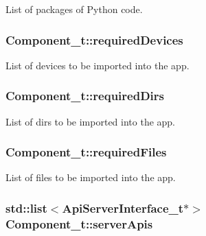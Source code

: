List of packages of Python code. 

\subsubsection[{\texorpdfstring{required\+Devices}{requiredDevices}}]{ Component\+\_\+t\+::required\+Devices}\hypertarget{struct_component__t_ad7349b66409d8767fc2ea653f87034cb}{}\label{struct_component__t_ad7349b66409d8767fc2ea653f87034cb}


List of devices to be imported into the app. 

\subsubsection[{\texorpdfstring{required\+Dirs}{requiredDirs}}]{ Component\+\_\+t\+::required\+Dirs}\hypertarget{struct_component__t_a3f50b7db2fb2b00793dbf02d45471972}{}\label{struct_component__t_a3f50b7db2fb2b00793dbf02d45471972}


List of dirs to be imported into the app. 

\subsubsection[{\texorpdfstring{required\+Files}{requiredFiles}}]{ Component\+\_\+t\+::required\+Files}\hypertarget{struct_component__t_a8aabc11a3a06b089a9a140cc0c7be020}{}\label{struct_component__t_a8aabc11a3a06b089a9a140cc0c7be020}


List of files to be imported into the app. 

\subsubsection[{\texorpdfstring{server\+Apis}{serverApis}}]{\setlength{\rightskip}{0pt plus 5cm}std\+::list$<${\bf Api\+Server\+Interface\+\_\+t}$\ast$$>$ Component\+\_\+t\+::server\+Apis}\hypertarget{struct_component__t_ae0b0c4e6dd0ba06030ddf020806facdb}{}\label{struct_component__t_ae0b0c4e6dd0ba06030ddf020806facdb}


